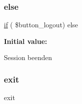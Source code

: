 \subsubsection{\texorpdfstring{else}{else}}
{\footnotesize\ttfamily \mbox{\hyperlink{view__all_8php_ac0971e25a4f61580752c758ef520f6b2}{if}} ( \$button\+\_\+logout) else}

{\bfseries Initial value\+:}
\begin{DoxyCode}{0}
\DoxyCodeLine{\{}

\end{DoxyCode}
Session beenden\mbox{\label{logout_8php_a6733eb5f605d09eaede9845835d71c4e}} 
\subsubsection{\texorpdfstring{exit}{exit}}
{\footnotesize\ttfamily exit}

